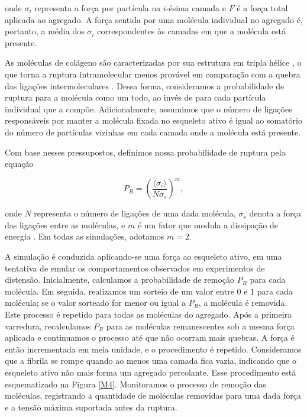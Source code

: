 \documentclass{article}
\begin{document}
        onde \(\sigma_{i}\) representa a força por partícula na \(i\)-ésima camada e \(F\) é a força total aplicada ao agregado. A força sentida 
        por uma molécula individual no agregado é, portanto, a média dos \(\sigma_{i}\) correspondentes às camadas em que a molécula está presente. 

        As moléculas de colágeno são caracterizadas por sua estrutura em tripla hélice \cite{BRODSKY1997545}, o que torna a ruptura intramolecular 
        menos provável em comparação com a quebra das ligações intermoleculares \cite{Parkinson1997}. Dessa forma, consideramos a probabilidade 
        de ruptura para a molécula como um todo, ao invés de para cada partícula individual que a compõe. Adicionalmente, assumimos que o número de 
        ligações responsáveis por manter a molécula fixada no esqueleto ativo é igual ao somatório do número de partículas vizinhas em cada camada 
        onde a molécula está presente. 

        Com base nesses pressupostos, definimos nossa probabilidade de ruptura pela equação 

        \begin{equation}
            P_{R} = \left(\frac{\langle \sigma_{i} \rangle}{N \sigma_{s}}\right)^{m},
        \end{equation}

        onde \(N\) representa o número de ligações de uma dada molécula, \(\sigma_{s}\) denota a força das ligações entre as moléculas, e \(m\) é um 
        fator que modula a dissipação de energia \cite{Parkinson1997,2013}. Em todas as simulações, adotamos \(m = 2\). 

        A simulação é conduzida aplicando-se uma força ao esqueleto ativo, em uma tentativa de emular os comportamentos observados em experimentos de 
        distensão. Inicialmente, calculamos a probabilidade de remoção \(P_{R}\) para cada molécula. Em seguida, realizamos um sorteio de um valor 
        entre 0 e 1 para cada molécula; se o valor sorteado for menor ou igual a \(P_{R}\), a molécula é removida. Este processo é repetido para 
        todas as moléculas do agregado. Após a primeira varredura, recalculamos \(P_{R}\) para as moléculas remanescentes sob a mesma força aplicada 
        e continuamos o processo até que não ocorram mais quebras. A força é então incrementada em meia unidade, e o procedimento é repetido. 
        Consideramos que a fibrila se rompe quando ao menos uma camada fica vazia, indicando que o esqueleto ativo não mais forma um agregado 
        percolante. Esse procedimento está esquematizado na Figura \ref{M4}. Monitoramos o processo de remoção das moléculas, registrando a quantidade 
        de moléculas removidas para uma dada força e a tensão máxima suportada antes da ruptura. 
\end{document}
